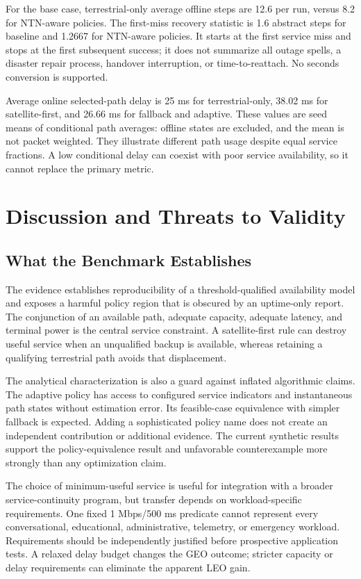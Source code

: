 \documentclass{IEEEoj}
\begin{document}

For the base case, terrestrial-only average offline steps are 12.6 per run, versus 8.2 for NTN-aware policies. The first-miss recovery statistic is 1.6 abstract steps for baseline and 1.2667 for NTN-aware policies. It starts at the first service miss and stops at the first subsequent success; it does not summarize all outage spells, a disaster repair process, handover interruption, or time-to-reattach. No seconds conversion is supported.

Average online selected-path delay is 25 ms for terrestrial-only, 38.02 ms for satellite-first, and 26.66 ms for fallback and adaptive. These values are seed means of conditional path averages: offline states are excluded, and the mean is not packet weighted. They illustrate different path usage despite equal service fractions. A low conditional delay can coexist with poor service availability, so it cannot replace the primary metric.

\section{Discussion and Threats to Validity}
\subsection{What the Benchmark Establishes}
The evidence establishes reproducibility of a threshold-qualified availability model and exposes a harmful policy region that is obscured by an uptime-only report. The conjunction of an available path, adequate capacity, adequate latency, and terminal power is the central service constraint. A satellite-first rule can destroy useful service when an unqualified backup is available, whereas retaining a qualifying terrestrial path avoids that displacement.

The analytical characterization is also a guard against inflated algorithmic claims. The adaptive policy has access to configured service indicators and instantaneous path states without estimation error. Its feasible-case equivalence with simpler fallback is expected. Adding a sophisticated policy name does not create an independent contribution or additional evidence. The current synthetic results support the policy-equivalence result and unfavorable counterexample more strongly than any optimization claim.

The choice of minimum-useful service is useful for integration with a broader service-continuity program, but transfer depends on workload-specific requirements. One fixed 1 Mbps/500 ms predicate cannot represent every conversational, educational, administrative, telemetry, or emergency workload. Requirements should be independently justified before prospective application tests. A relaxed delay budget changes the GEO outcome; stricter capacity or delay requirements can eliminate the apparent LEO gain.
\end{document}
